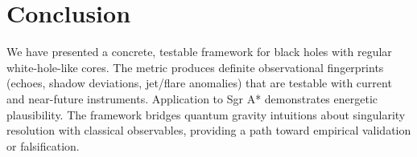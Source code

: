 \documentclass[11pt,a4paper]{article}
\begin{document}
\section{Conclusion}

We have presented a concrete, testable framework for black holes with regular white-hole-like cores. The metric produces definite observational fingerprints (echoes, shadow deviations, jet/flare anomalies) that are testable with current and near-future instruments. Application to Sgr A* demonstrates energetic plausibility. The framework bridges quantum gravity intuitions about singularity resolution with classical observables, providing a path toward empirical validation or falsification.


\end{document}
